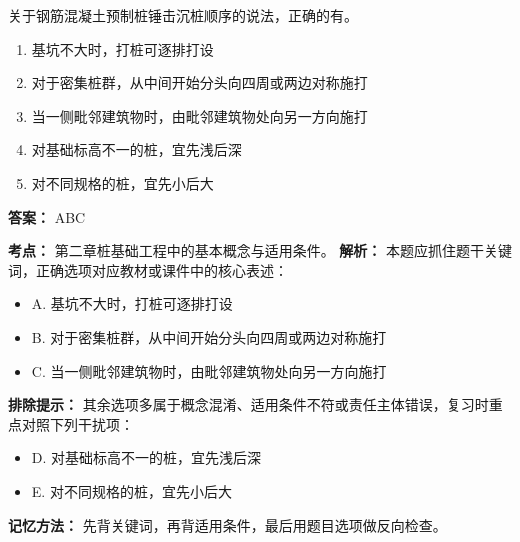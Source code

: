 \documentclass[UTF8,fontset=fandol,11pt]{ctexart}
\begin{document}
\begin{quizbox}[title={第 10 题}]
关于钢筋混凝土预制桩锤击沉桩顺序的说法，正确的有。\\
\begin{enumerate}[label=\Alph*.]
\item 基坑不大时，打桩可逐排打设
\item 对于密集桩群，从中间开始分头向四周或两边对称施打
\item 当一侧毗邻建筑物时，由毗邻建筑物处向另一方向施打
\item 对基础标高不一的桩，宜先浅后深
\item 对不同规格的桩，宜先小后大
\end{enumerate}
\textbf{答案：} ABC
\vspace{0.25em}
\begin{answerbox}[title={考点解析}]
\textbf{考点：} 第二章桩基础工程中的基本概念与适用条件。
\textbf{解析：} 本题应抓住题干关键词，正确选项对应教材或课件中的核心表述：
\begin{itemize}
\item A. 基坑不大时，打桩可逐排打设
\item B. 对于密集桩群，从中间开始分头向四周或两边对称施打
\item C. 当一侧毗邻建筑物时，由毗邻建筑物处向另一方向施打
\end{itemize}
\textbf{排除提示：} 其余选项多属于概念混淆、适用条件不符或责任主体错误，复习时重点对照下列干扰项：
\begin{itemize}
\item D. 对基础标高不一的桩，宜先浅后深
\item E. 对不同规格的桩，宜先小后大
\end{itemize}
\textbf{记忆方法：} 先背关键词，再背适用条件，最后用题目选项做反向检查。
\end{answerbox}
\end{quizbox}
\end{document}
